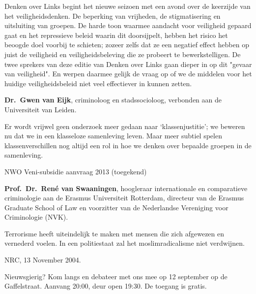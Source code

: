 \documentclass{article}
\begin{document}
Denken over Links begint het nieuwe seizoen met een avond over de keerzijde van
het veiligheidsdenken. De beperking van vrijheden, de stigmatisering en
uitsluiting van groepen. De harde toon waarmee aandacht voor veiligheid gepaard
gaat en het repressieve beleid waarin dit doorsijpelt, hebben het risico het
beoogde doel voorbij te schieten; zozeer zelfs dat ze een negatief effect
hebben op juist de veiligheid en veiligheidsbeleving die ze probeert te
bewerkstelligen. De twee sprekers van deze editie van Denken over Links gaan
dieper in op dit "gevaar van veiligheid". En werpen daarmee gelijk de vraag op
of we de middelen voor het huidige veiligheidsbeleid niet veel effectiever in
kunnen zetten.

\vfill

\textbf{Dr.\ Gwen van Eijk}, criminoloog en stadssocioloog, verbonden aan de
Universiteit van Leiden.
\begin{myquote}
  Er wordt vrijwel geen onderzoek meer gedaan naar `klassenjustitie'; we
  beweren nu dat we in een klasseloze samenleving leven. Maar meer subtiel
  spelen klassenverschillen nog altijd een rol in hoe we denken over bepaalde
  groepen in de samenleving.
\end{myquote}
{\footnotesize NWO Veni-subsidie aanvraag 2013 (toegekend)}

\vfill

\textbf{Prof.\ Dr.\ Ren\'e van Swaaningen}, hoogleraar internationale en comparatieve
criminologie aan de Erasmus Universiteit Rotterdam, directeur van de Erasmus
Graduate School of Law en voorzitter van de Nederlandse Vereniging voor
Criminologie (NVK).
\begin{myquote}
  Terrorisme heeft uiteindelijk te maken met mensen die zich afgewezen en
  vernederd voelen. In een politiestaat zal het moslimradicalisme niet
  verdwijnen.
\end{myquote}
{\footnotesize NRC, 13 November 2004.}

\vfill

Nieuwsgierig? Kom langs en debateer met ons mee op 12 september op de Gaffelstraat.
Aanvang 20:00, deur open 19:30. De toegang is gratis.

\myhline
\end{document}
